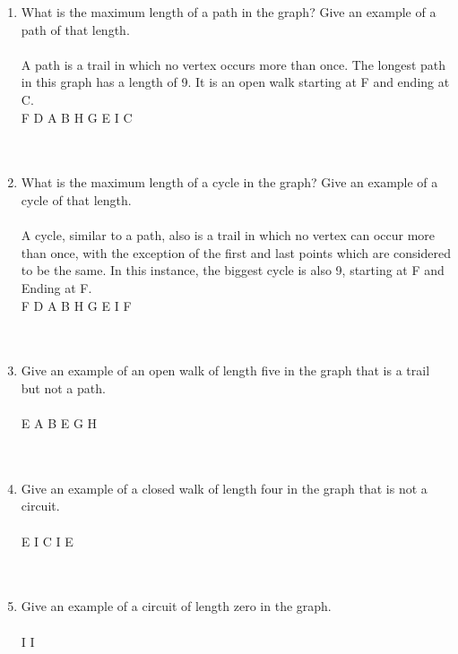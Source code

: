     \begin{enumerate}[label=(\roman*)]
        \item What is the maximum length of a path in the graph? Give an example of a path of that length.\\\\
           A path is a trail in which no vertex occurs more than once. The longest path in this graph has a length of 9. It is an open walk starting at F and ending at C. \\
           
           F \to D \to A \to B \to H \to G \to E \to I \to C
           \\
           
\\\\
        \item What is the maximum length of a cycle in the graph? Give an example of a cycle of that length.\\\\
           A cycle, similar to a path, also is a trail in which no vertex can occur more than once, with the exception of the first and last points which are considered to be the same. In this instance, the biggest cycle is also 9, starting at F and Ending at F. \\
           
           F \to D \to A \to B \to H \to G \to E \to I \to F
           \\
           
\\\\
        \item Give an example of an open walk of length five in the graph that is a trail but not a path.\\\\
          E \to A \to B \to E \to G \to H \\
          
\\\\
        \item Give an example of a closed walk of length four in the graph that is not a circuit.\\\\
           E \to I \to C \to I \to E \\
           
\\\\
        \item Give an example of a circuit of length zero in the graph.\\\\
           I \to I \\
           
\\\\
    \end{enumerate}
    \newpage
    

